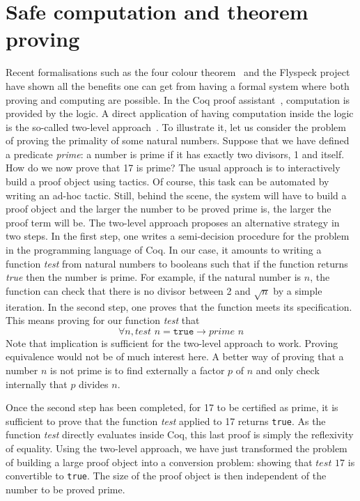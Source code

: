 

\section{Safe computation and theorem proving}

Recent formalisations such as the four colour theorem~\cite{4color} and the Flyspeck project~\cite{kepler} 
have shown all the benefits one can get from having a formal system where both proving and computing are
possible. In the {\sc Coq} proof assistant~\cite{Coq}, computation is
provided by the logic. A direct application of having computation inside the logic is 
the so-called two-level approach~\cite{boutin}. To illustrate it, 
let us consider the problem of proving the primality of some natural 
numbers.
Suppose that we have defined a predicate {\it prime}: a number is prime 
if it has exactly two divisors, 1 and itself. 
How do we now prove that 17 is prime? The usual approach is to
interactively build a proof object using tactics. Of course, this task can be 
automated by writing an ad-hoc tactic. Still, behind the scene, the system 
will have to build a proof object and the larger the number to be proved
prime is, the larger the proof term will be.
The two-level approach proposes an alternative
strategy in two steps. In the first step, one writes a semi-decision procedure
for the problem in the programming language of {\sc Coq}. In our case, it amounts 
to writing a function {\it test} from natural numbers to booleans such that if the function
returns {\it true} then the number is prime. 
For example, if the natural number
is $n$, the function can check that there is no divisor between 2 and $\sqrt{n}$
by a simple iteration. 
In the second step, one proves that the function meets 
its specification. This means proving for our function {\it test} that
$$
\forall n, \textit{test}\,\, n = \texttt{true} \rightarrow \textit{prime}\,\, n
$$
Note that implication is sufficient for the two-level approach to work.
Proving equivalence would not be of much interest here.
A better way of proving that a number $n$ is not prime is to find externally a factor
$p$ of $n$ and only check internally that $p$ divides $n$.

Once the second step has been completed, for 17 to be certified as prime, 
it is sufficient to prove that the function
{\it test} applied to 17 returns {\tt true}. As the function {\it test} directly
evaluates inside {\sc Coq}, this last proof is simply the reflexivity of equality.
Using the two-level approach, we have just transformed the problem of building a 
large proof object into a conversion problem: showing that $\textit{test}\,\, 17$ is convertible
to {\tt true}.  The size of the proof object is then independent of the number to be proved
prime. 

